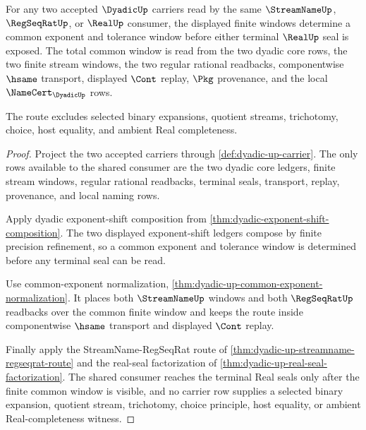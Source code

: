 \begin{theorem}
\label{thm:dyadic-common-exponent-totality}
For any two accepted $\DyadicUp$ carriers read by the same $\StreamNameUp$, $\RegSeqRatUp$, or $\RealUp$ consumer, the displayed finite windows determine a common exponent and tolerance window before either terminal $\RealUp$ seal is exposed. The total common window is read from the two dyadic core rows, the two finite stream windows, the two regular rational readbacks, componentwise $\hsame$ transport, displayed $\Cont$ replay, $\Pkg$ provenance, and the local $\NameCert_{\DyadicUp}$ rows.

The route excludes selected binary expansions, quotient streams, trichotomy, choice, host equality, and ambient Real completeness.
\end{theorem}
\begin{proof}
Project the two accepted carriers through \autoref{def:dyadic-up-carrier}. The only rows available to the shared consumer are the two dyadic core ledgers, finite stream windows, regular rational readbacks, terminal seals, transport, replay, provenance, and local naming rows.

Apply dyadic exponent-shift composition from \autoref{thm:dyadic-exponent-shift-composition}. The two displayed exponent-shift ledgers compose by finite precision refinement, so a common exponent and tolerance window is determined before any terminal seal can be read.

Use common-exponent normalization, \autoref{thm:dyadic-up-common-exponent-normalization}. It places both $\StreamNameUp$ windows and both $\RegSeqRatUp$ readbacks over the common finite window and keeps the route inside componentwise $\hsame$ transport and displayed $\Cont$ replay.

Finally apply the StreamName-RegSeqRat route of \autoref{thm:dyadic-up-streamname-regseqrat-route} and the real-seal factorization of \autoref{thm:dyadic-up-real-seal-factorization}. The shared consumer reaches the terminal Real seals only after the finite common window is visible, and no carrier row supplies a selected binary expansion, quotient stream, trichotomy, choice principle, host equality, or ambient Real-completeness witness.
\end{proof}

